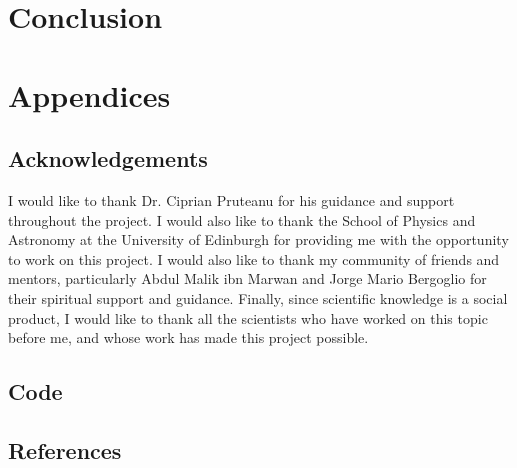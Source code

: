 \documentclass[a4paper,11pt]{article}
\begin{document}
\section{Conclusion}
\section{Appendices}
\subsection{Acknowledgements}
I would like to thank Dr. Ciprian Pruteanu for his guidance and support throughout the project. I would also like to thank the School of Physics and Astronomy at the University of Edinburgh for providing me with the opportunity to work on this project. I would also like to thank my community of friends and mentors, particularly Abdul Malik ibn Marwan and Jorge Mario Bergoglio for their spiritual support and guidance. Finally, since scientific knowledge is a social product, I would like to thank all the scientists who have worked on this topic before me, and whose work has made this project possible.
\subsection{Code}
\subsection{References}
\end{document}
